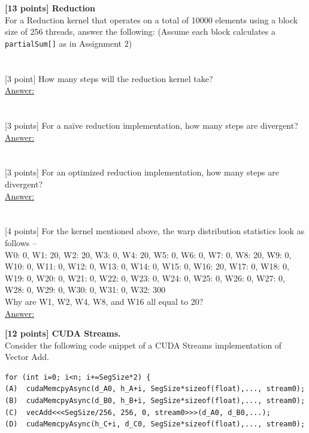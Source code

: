 \documentclass[12pt]{exam}
\newcommand{\Ans}{\underline{Answer:}\ }
\newcommand{\smallbox}{\framebox[5cm]{\rule{0pt}{1.1cm}}}
\newcommand{\paragraphbox}[1]{\framebox[\linewidth]{\rule{0pt}{#1}}}
\begin{document}
\begin{questions}
\vspace{8pt}
\question \textbf{[13 points] Reduction}\\
For a Reduction kernel that operates on a total of 10000 elements using a block size of 256
threads, answer the following: (Assume each block calculates a \texttt{partialSum[]} as in
Assignment 2)
\begin{parts}
  \part {}[3 point] How many steps will the reduction kernel take?\\[10pt]
        \Ans \smallbox
  \part {}[3 points] For a na\"ive reduction implementation, how many steps are divergent?\\[10pt]
        \Ans \smallbox
  \part {}[3 points] For an optimized reduction implementation, how many steps are divergent?\\[10pt]
        \Ans \smallbox
  \part {}[4 points] For the kernel mentioned above, the warp distribution statistics look as
        follows --\\[4pt]
        W0: 0, W1: 20, W2: 20, W3: 0, W4: 20, W5: 0, W6: 0, W7: 0, W8: 20, W9: 0, W10: 0,
        W11: 0, W12: 0, W13: 0, W14: 0, W15: 0, W16: 20, W17: 0, W18: 0, W19: 0, W20: 0,
        W21: 0, W22: 0, W23: 0, W24: 0, W25: 0, W26: 0, W27: 0, W28: 0, W29: 0, W30: 0,
        W31: 0, W32: 300\\[4pt]
        Why are W1, W2, W4, W8, and W16 all equal to 20?\\[10pt]
        \Ans \paragraphbox{3.4cm}
\end{parts}

\newpage
\question \textbf{[12 points] CUDA Streams.}\\
Consider the following code snippet of a CUDA Streams implementation of Vector Add.

\begin{Verbatim}[xleftmargin=1em]
for (int i=0; i<n; i+=SegSize*2) {
(A)  cudaMemcpyAsync(d_A0, h_A+i, SegSize*sizeof(float),..., stream0);
(B)  cudaMemcpyAsync(d_B0, h_B+i, SegSize*sizeof(float),..., stream0);
(C)  vecAdd<<<SegSize/256, 256, 0, stream0>>>(d_A0, d_B0,...);
(D)  cudaMemcpyAsync(h_C+i, d_C0, SegSize*sizeof(float),..., stream0);


\end{Verbatim}
\end{questions}
\end{document}
